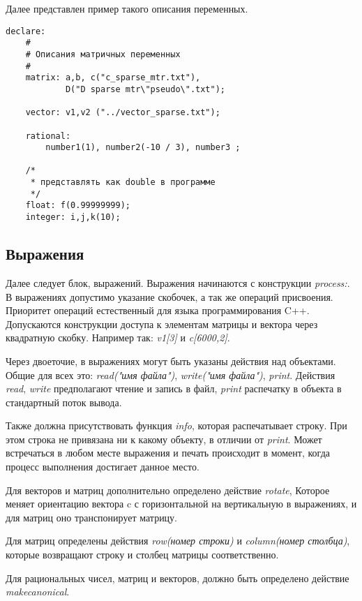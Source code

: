 \documentclass[a4paper,11pt]{article}
\begin{document}
Далее представлен 
пример такого описания переменных.

\begin{verbatim}
declare:
    #
    # Описания матричных переменных
    #
    matrix: a,b, c("c_sparse_mtr.txt"),
            D("D sparse mtr\"pseudo\".txt");

    vector: v1,v2 ("../vector_sparse.txt");

    rational:
        number1(1), number2(-10 / 3), number3 ;

    /*
     * представлять как double в программе
     */
    float: f(0.99999999);
    integer: i,j,k(10);

\end{verbatim}

\subsection{Выражения}

Далее следует блок, выражений. Выражения начинаются с конструкции 
\textit{process:}.
В выражениях допустимо указание скобочек, а так же операций присвоения.
Приоритет операций естественный для языка программирования C++.
Допускаются конструкции доступа к элементам матрицы и вектора через
квадратную скобку. Например так: \textit{v1[3]} и \textit{c[6000,2]}.

Через двоеточие, в выражениях могут быть указаны действия над объектами.
Общие для всех это: \textit{read("имя файла")}, \textit{write("имя файла")},
\textit{print}. Действия \textit{read}, \textit{write} 
предполагают чтение и запись в файл, \textit{print} распечатку в объекта 
в стандартный поток вывода.

Также должна присутствовать функция \textit{info}, 
которая распечатывает строку. При этом строка не привязана ни к какому
объекту, в отличии от \textit{print}. Может встречаться в любом месте
выражения и печать происходит в момент, когда процесс выполнения достигает
данное место.

Для векторов и матриц дополнительно определено действие
\textit{rotate}, Которое меняет ориентацию вектора c с горизонтальной
на вертикальную  в выражениях, и  для матриц оно транспонирует матрицу.

Для матриц определены действия \textit{row(номер строки)} и 
\textit{column(номер столбца)}, которые возвращают строку и 
столбец матрицы соответственно.

Для рациональных чисел, матриц и векторов, должно быть определено действие
\textit{make{\textunderscore}canonical}.
\end{document}
